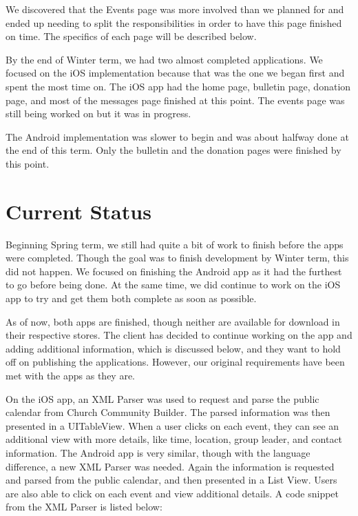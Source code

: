 \documentclass[letterpaper,10pt,draftclsnofoot,onecolumn,titlepage]{IEEEtran}
\begin{document}
		We discovered that the Events page was more involved than we planned for and ended up needing to split the responsibilities in order to have this page finished on time. 
		The specifics of each page will be described below. 
		
				
		By the end of Winter term, we had two almost completed applications.
		We focused on the iOS implementation because that was the one we began first and spent the most time on. 
		The iOS app had the home page, bulletin page, donation page, and most of the messages page finished at this point. 
		The events page was still being worked on but it was in progress. 
		
		The Android implementation was slower to begin and was about halfway done at the end of this term. 
		Only the bulletin and the donation pages were finished by this point. 
		
		
		
\section{Current Status}
		Beginning Spring term, we still had quite a bit of work to finish before the apps were completed. 
		Though the goal was to finish development by Winter term, this did not happen. 
		We focused on finishing the Android app as it had the furthest to go before being done. 
		At the same time, we did continue to work on the iOS app to try and get them both complete as soon as possible. 
		
		As of now, both apps are finished, though neither are available for download in their respective stores.
		The client has decided to continue working on the app and adding additional information, which is discussed below, and they want to hold off on publishing the applications. 
		However, our original requirements have been met with the apps as they are. 

On the iOS app, an XML Parser was used to request and parse the public calendar from Church Community Builder.
		The parsed information was then presented in a UITableView. 
		When a user clicks on each event, they can see an additional view with more details, like time, location, group leader, and contact information.
		The Android app is very similar, though with the language difference, a new XML Parser was needed. 
		Again the information is requested and parsed from the public calendar, and then presented in a List View. 
		Users are also able to click on each event and view additional details. 
		A code snippet from the XML Parser is listed below: 
		
\end{document}
